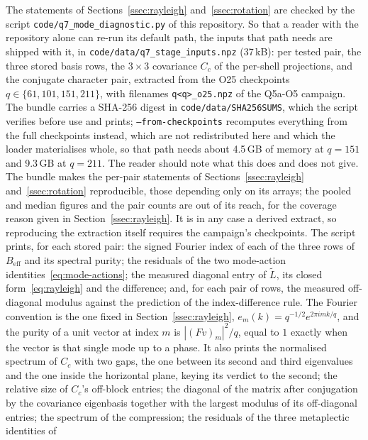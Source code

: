 \documentclass[11pt,a4paper]{article}
\begin{document}
    The statements of Sections~\ref{ssec:rayleigh} and~\ref{ssec:rotation} are checked by the
    script \texttt{code/q7\_mode\_diagnostic.py} of this repository.
    So that a reader with the repository alone can re-run its default path, the inputs that path
    needs are shipped with
    it, in \texttt{code/data/q7\_stage\_inputs.npz} (37\,kB): per tested pair, the three stored
    basis rows, the $3 \times 3$ covariance $C_c$ of the per-shell projections, and the conjugate
    character pair, extracted from the O25 checkpoints
    $q\in\{61,101,151,211\}$, with filenames \texttt{q<q>\_o25.npz} of the Q5a-O5 campaign.
    The bundle carries a SHA-256 digest in \texttt{code/data/SHA256SUMS}, which the script verifies
    before use and prints; \texttt{--from-checkpoints} recomputes everything from the full
    checkpoints instead, which are not redistributed here and which the loader materialises whole,
    so that path needs about 4.5\,GB of memory at $q = 151$ and 9.3\,GB at $q = 211$.
    The reader should note what this does and does not give.
    The bundle makes the per-pair statements of Sections~\ref{ssec:rayleigh}
    and~\ref{ssec:rotation} reproducible, those depending only on its arrays; the pooled and median
    figures and the pair counts are out of its reach, for the coverage reason given in
    Section~\ref{ssec:rayleigh}.
    It is in any case a derived extract, so reproducing the extraction itself requires the
    campaign's checkpoints.
    The script prints, for each stored pair:
    the signed Fourier index of each of the three rows of $B_{\mathrm{eff}}$ and its spectral
    purity; the residuals of the two mode-action identities~\eqref{eq:mode-actions}; the measured
    diagonal entry of $\tilde L$, its closed form~\eqref{eq:rayleigh} and the difference; and, for
    each pair of rows, the measured off-diagonal modulus against the prediction of the
    index-difference rule.
    The Fourier convention is the one fixed in Section~\ref{ssec:rayleigh},
    $e_m(k) = q^{-1/2}e^{2\pi i m k/q}$, and the purity of a unit vector at index $m$ is
    $|(Fv)_m|^2/q$, equal to $1$ exactly when the vector is that single mode up to a phase.
    It also prints the normalised spectrum of $C_c$ with two gaps, the one between its second and
    third eigenvalues and the one inside the horizontal plane, keying its verdict to the second;
    the relative size of $C_c$'s off-block entries; the diagonal of the matrix after conjugation by
    the covariance eigenbasis together with the largest modulus of its off-diagonal entries; the
    spectrum of the compression; the residuals of the three metaplectic identities of
\end{document}
